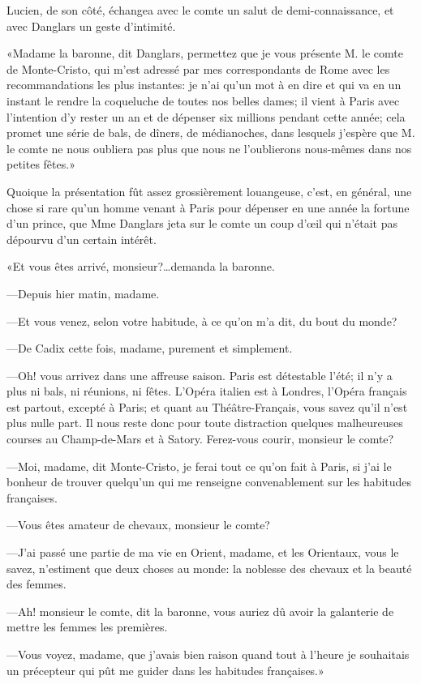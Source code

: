 Lucien, de son côté, échangea avec le comte un salut de demi-connaissance, et avec Danglars un geste d'intimité.  

«Madame la baronne, dit Danglars, permettez que je vous présente M. le comte de Monte-Cristo, qui m'est adressé par mes correspondants de Rome avec les recommandations les plus instantes: je n'ai qu'un mot à en dire et qui va en un instant le rendre la coqueluche de toutes nos belles dames; il vient à Paris avec l'intention d'y rester un an et de dépenser six millions pendant cette année; cela promet une série de bals, de dîners, de médianoches, dans lesquels j'espère que M. le comte ne nous oubliera pas plus que nous ne l'oublierons nous-mêmes dans nos petites fêtes.» 

Quoique la présentation fût assez grossièrement louangeuse, c'est, en général, une chose si rare qu'un homme venant à Paris pour dépenser en une année la fortune d'un prince, que Mme Danglars jeta sur le comte un coup d'œil qui n'était pas dépourvu d'un certain intérêt. 

«Et vous êtes arrivé, monsieur?\dots demanda la baronne. 

—Depuis hier matin, madame. 

—Et vous venez, selon votre habitude, à ce qu'on m'a dit, du bout du monde? 

—De Cadix cette fois, madame, purement et simplement. 

—Oh! vous arrivez dans une affreuse saison. Paris est détestable l'été; il n'y a plus ni bals, ni réunions, ni fêtes. L'Opéra italien est à Londres, l'Opéra français est partout, excepté à Paris; et quant au Théâtre-Français, vous savez qu'il n'est plus nulle part. Il nous reste donc pour toute distraction quelques malheureuses courses au Champ-de-Mars et à Satory. Ferez-vous courir, monsieur le comte? 

—Moi, madame, dit Monte-Cristo, je ferai tout ce qu'on fait à Paris, si j'ai le bonheur de trouver quelqu'un qui me renseigne convenablement sur les habitudes françaises. 

—Vous êtes amateur de chevaux, monsieur le comte? 

—J'ai passé une partie de ma vie en Orient, madame, et les Orientaux, vous le savez, n'estiment que deux choses au monde: la noblesse des chevaux et la beauté des femmes.  

—Ah! monsieur le comte, dit la baronne, vous auriez dû avoir la galanterie de mettre les femmes les premières. 

—Vous voyez, madame, que j'avais bien raison quand tout à l'heure je souhaitais un précepteur qui pût me guider dans les habitudes françaises.» 

